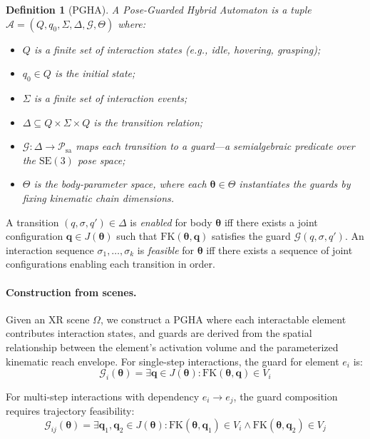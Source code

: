 \documentclass[11pt,letterpaper]{article}
\newtheorem{definition}[theorem]{Definition}
\newcommand{\SE}{\mathrm{SE}(3)}
\newcommand{\FK}{\mathrm{FK}}
\newcommand{\scene}{\Omega}
\newcommand{\param}{\Theta}
\newcommand{\bodyp}{\boldsymbol{\theta}}
\newcommand{\joint}{\mathbf{q}}
\begin{document}
\begin{definition}[PGHA]
A Pose-Guarded Hybrid Automaton is a tuple $\mathcal{A} = (Q, q_0, \Sigma, \Delta, \mathcal{G}, \param)$ where:
\begin{itemize}[nosep]
  \item $Q$ is a finite set of interaction states (e.g., idle, hovering, grasping);
  \item $q_0 \in Q$ is the initial state;
  \item $\Sigma$ is a finite set of interaction events;
  \item $\Delta \subseteq Q \times \Sigma \times Q$ is the transition relation;
  \item $\mathcal{G}: \Delta \to \mathcal{P}_{\mathrm{sa}}$ maps each transition to a \emph{guard}---a semialgebraic predicate over the $\SE$ pose space;
  \item $\param$ is the body-parameter space, where each $\bodyp \in \param$ instantiates the guards by fixing kinematic chain dimensions.
\end{itemize}
\end{definition}

A transition $(q, \sigma, q') \in \Delta$ is \emph{enabled} for body $\bodyp$ iff there exists a joint configuration $\joint \in J(\bodyp)$ such that $\FK(\bodyp, \joint)$ satisfies the guard $\mathcal{G}(q, \sigma, q')$.
An interaction sequence $\sigma_1, \ldots, \sigma_k$ is \emph{feasible} for $\bodyp$ iff there exists a sequence of joint configurations enabling each transition in order.

\paragraph{Construction from scenes.}
Given an XR scene $\scene$, we construct a PGHA where each interactable element contributes interaction states, and guards are derived from the spatial relationship between the element's activation volume and the parameterized kinematic reach envelope.
For single-step interactions, the guard for element $e_i$ is:
\begin{equation}
\mathcal{G}_i(\bodyp) = \exists \joint \in J(\bodyp): \FK(\bodyp, \joint) \in V_i
\end{equation}

For multi-step interactions with dependency $e_i \to e_j$, the guard composition requires trajectory feasibility:
\begin{equation}
\mathcal{G}_{ij}(\bodyp) = \exists \joint_1, \joint_2 \in J(\bodyp): \FK(\bodyp, \joint_1) \in V_i \wedge \FK(\bodyp, \joint_2) \in V_j
\end{equation}
\end{document}
